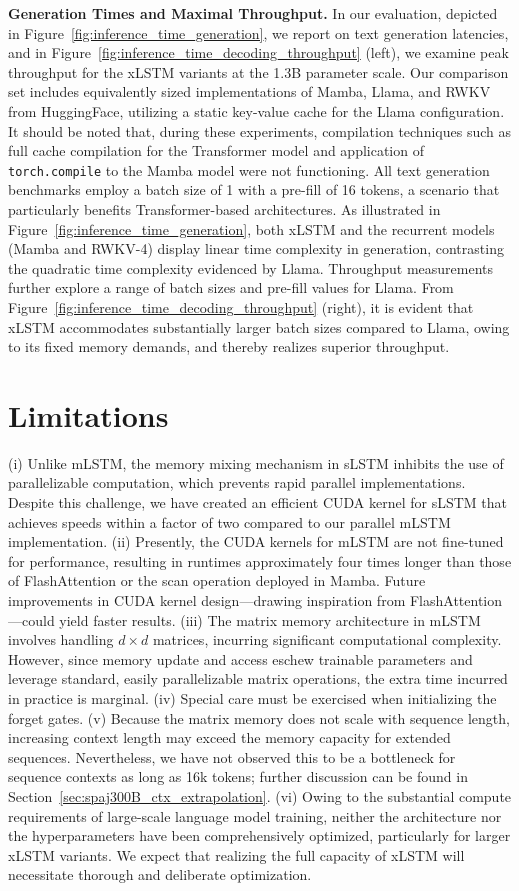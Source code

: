 \textbf{Generation Times and Maximal Throughput.} In our evaluation, depicted in Figure~\ref{fig:inference_time_generation}, we report on text generation latencies, and in Figure~\ref{fig:inference_time_decoding_throughput} (left), we examine peak throughput for the xLSTM variants at the 1.3B parameter scale. Our comparison set includes equivalently sized implementations of Mamba, Llama, and RWKV from HuggingFace, utilizing a static key-value cache for the Llama configuration. It should be noted that, during these experiments, compilation techniques such as full cache compilation for the Transformer model and application of \texttt{torch.compile} to the Mamba model were not functioning. All text generation benchmarks employ a batch size of 1 with a pre-fill of 16 tokens, a scenario that particularly benefits Transformer-based architectures. As illustrated in Figure~\ref{fig:inference_time_generation}, both xLSTM and the recurrent models (Mamba and RWKV-4) display linear time complexity in generation, contrasting the quadratic time complexity evidenced by Llama. Throughput measurements further explore a range of batch sizes and pre-fill values for Llama. From Figure~\ref{fig:inference_time_decoding_throughput} (right), it is evident that xLSTM accommodates substantially larger batch sizes compared to Llama, owing to its fixed memory demands, and thereby realizes superior throughput.

\section{Limitations}

(i) Unlike mLSTM, the memory mixing mechanism in sLSTM inhibits the use of parallelizable computation, which prevents rapid parallel implementations. Despite this challenge, we have created an efficient CUDA kernel for sLSTM that achieves speeds within a factor of two compared to our parallel mLSTM implementation. (ii) Presently, the CUDA kernels for mLSTM are not fine-tuned for performance, resulting in runtimes approximately four times longer than those of FlashAttention or the scan operation deployed in Mamba. Future improvements in CUDA kernel design—drawing inspiration from FlashAttention—could yield faster results. (iii) The matrix memory architecture in mLSTM involves handling $d \times d$ matrices, incurring significant computational complexity. However, since memory update and access eschew trainable parameters and leverage standard, easily parallelizable matrix operations, the extra time incurred in practice is marginal. (iv) Special care must be exercised when initializing the forget gates. (v) Because the matrix memory does not scale with sequence length, increasing context length may exceed the memory capacity for extended sequences. Nevertheless, we have not observed this to be a bottleneck for sequence contexts as long as 16k tokens; further discussion can be found in Section~\ref{sec:spaj300B_ctx_extrapolation}. (vi) Owing to the substantial compute requirements of large-scale language model training, neither the architecture nor the hyperparameters have been comprehensively optimized, particularly for larger xLSTM variants. We expect that realizing the full capacity of xLSTM will necessitate thorough and deliberate optimization.

